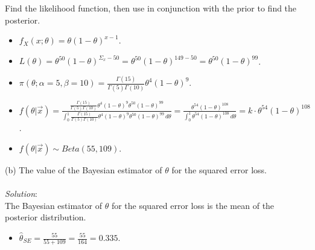 \documentclass[12pt]{article}
\newcommand{\ds}{\displaystyle}
\begin{document}
\noindent
Find the likelihood function, then use in conjunction with the prior to find the posterior. \\

\begin{itemize}
    \item $ \ds f_X(x ; \theta) = \theta (1 - \theta)^{x - 1} $. \\
    \item $ \ds L(\theta) = \theta^{50} (1 - \theta)^{\Sigma_{x} - 50} = \theta^{50} (1 - \theta)^{149 - 50} = \theta^{50} (1 - \theta)^{99} $. \\
    \item $ \ds \pi(\theta ; \alpha = 5, \beta = 10) = \frac{ \Gamma(15) }{ \Gamma(5)\Gamma(10) } \theta^{4} (1 - \theta)^{9} $. \\
    \item $ \ds f(\theta | \overrightarrow{x}) = \frac{ \ds \frac{ \Gamma(15) }{ \Gamma(5)\Gamma(10) } \theta^{4} (1 - \theta)^{9} \theta^{50} (1 - \theta)^{99} }{ \ds\int_{0}^{1} \frac{ \Gamma(15) }{ \Gamma(5)\Gamma(10) } \theta^{4} (1 - \theta)^{9} \theta^{50} (1 - \theta)^{99} \, d\theta } = 
    \frac{ \ds \theta^{54} (1 - \theta)^{108} }{ \ds\int_{0}^{1} \theta^{54} (1 - \theta)^{108} \, d\theta } = k \cdot \theta^{54} (1 - \theta)^{108}$. \\
    \item $ \ds f(\theta | \overrightarrow{x}) \sim Beta(55, 109) $. \\
\end{itemize}

\vspace{2.5mm}

\newpage 

(b) The value of the Bayesian estimator of $ \theta $ for the squared error loss. \\
\vspace{2.5mm} \\
\textit{Solution}:
\vspace{2.5mm} \\

\noindent
The Bayesian estimator of $ \theta $ for the squared error loss is the mean of the posterior distribution. \\

\begin{itemize}
    \item $ \ds \hat{\theta}_{SE} = \frac{55}{55 + 109} = \frac{55}{164} = 0.335 $.
\end{itemize}
\end{document}
